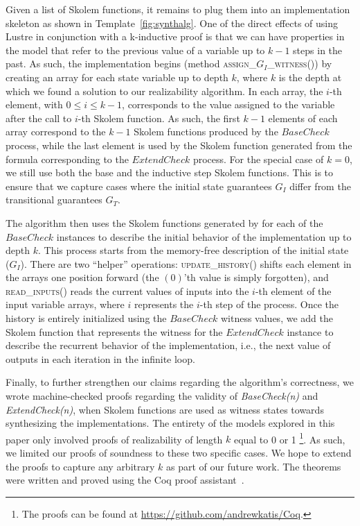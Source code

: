 Given a list of Skolem functions, it remains to plug them into
an implementation skeleton as shown in Template~\ref{fig:synthalg}. One of the
direct effects of using Lustre in conjunction with a k-inductive proof
is that we can have properties in the model that refer to the
previous value of a variable up to $k-1$ steps in the past. As such,
the implementation begins (method \textsc{assign\_$G_{I}$\_witness()})
by creating an array for each state variable up to depth $k$, where
$k$ is the depth at which we found a solution to our realizability
algorithm. In each array, the $i$-th element, with $0\leq i \leq k-1$,
corresponds to the value assigned to the variable after the call to
$i$-th Skolem function. As such, the first $k-1$ elements of each array
correspond to the $k-1$ Skolem functions produced by the
$\mathit{BaseCheck}$ process, while the last element is used by the
Skolem function generated from the formula corresponding to the
$\mathit{ExtendCheck}$ process. For the special case of $k=0$, we still use
both the base and the inductive step Skolem functions.
This is to ensure that we capture cases where the initial state guarantees $G_I$ differ from the
transitional guarantees $G_T$.

The algorithm then uses the Skolem functions generated by \aeval for each
of the $\mathit{BaseCheck}$ instances to describe the initial behavior of
the implementation up to depth $k$.  This process starts from the memory-free
description of the initial state ($G_I$).
There are two ``helper'' operations:
\textsc{update\_history()} shifts each element in the arrays one position
forward (the $(0)$'th value is simply forgotten), and \textsc{read\_inputs()} reads the
current values of inputs into the $i$-th element of the input variable arrays,
where $i$ represents the $i$-th step of the process.
Once the history is entirely initialized using the $\mathit{BaseCheck}$ witness values,
we add the Skolem function that represents the witness for the
$\mathit{ExtendCheck}$ instance to describe the recurrent behavior of the implementation, i.e.,
the next value of outputs in each iteration in the infinite loop.

Finally, to further strengthen our claims regarding the algorithm's
correctness, we wrote machine-checked proofs regarding the validity of \textit{BaseCheck(n)} and
\textit{ExtendCheck(n)}, when Skolem functions are used as witness states
towards synthesizing the implementations. The entirety of the models explored in
this paper only involved proofs of realizability of length $k$ equal to 0 or
1%
\footnote{The proofs can be found at \url{https://github.com/andrewkatis/Coq}.}.
As such, we limited our proofs of soundness to these two specific cases. We hope
to extend the proofs to capture any arbitrary $k$ as part of our future work.
The theorems were written and proved using the Coq proof
assistant~\cite{Coqmanual}.

